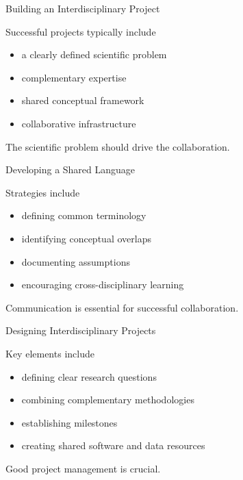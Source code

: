 \documentclass{beamer}
\begin{document}

\begin{frame}{Building an Interdisciplinary Project}

Successful projects typically include

\begin{itemize}
\item a clearly defined scientific problem
\item complementary expertise
\item shared conceptual framework
\item collaborative infrastructure
\end{itemize}

The scientific problem should drive the collaboration.

\end{frame}


\begin{frame}{Developing a Shared Language}

Strategies include

\begin{itemize}
\item defining common terminology
\item identifying conceptual overlaps
\item documenting assumptions
\item encouraging cross-disciplinary learning
\end{itemize}

Communication is essential for successful collaboration.

\end{frame}


\begin{frame}{Designing Interdisciplinary Projects}

Key elements include

\begin{itemize}
\item defining clear research questions
\item combining complementary methodologies
\item establishing milestones
\item creating shared software and data resources
\end{itemize}

Good project management is crucial.

\end{frame}
\end{document}

